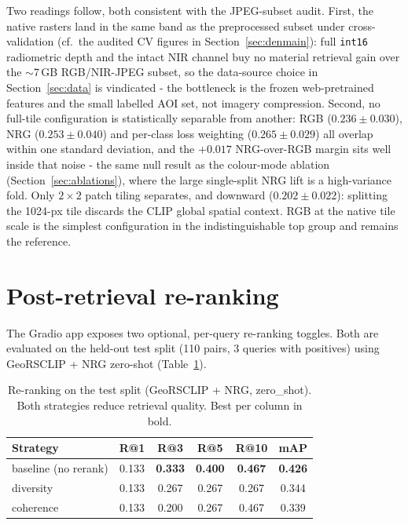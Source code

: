 \documentclass{article}
\begin{document}
Two readings follow, both consistent with the JPEG-subset audit. First, the native
rasters land in the same band as the preprocessed subset under cross-validation
(cf.\ the audited CV figures in Section~\ref{sec:denmain}): full \texttt{int16}
radiometric depth and the intact NIR channel buy no material retrieval gain over
the $\sim$7\,GB RGB/NIR-JPEG subset, so the data-source choice in
Section~\ref{sec:data} is vindicated - the bottleneck is the frozen
web-pretrained features and the small labelled AOI set, not imagery compression.
Second, no full-tile configuration is statistically separable from another: RGB
($0.236\pm0.030$), NRG ($0.253\pm0.040$) and per-class loss weighting
($0.265\pm0.029$) all overlap within one standard deviation, and the $+0.017$
NRG-over-RGB margin sits well inside that noise - the same null result as the
colour-mode ablation (Section~\ref{sec:ablations}), where the large single-split
NRG lift is a high-variance fold. Only $2\times2$ patch tiling separates, and
downward ($0.202\pm0.022$): splitting the 1024-px tile discards the CLIP global
spatial context. RGB at the native tile scale is the simplest configuration in the
indistinguishable top group and remains the reference.

\section{Post-retrieval re-ranking}
\label{sec:rerank}

The Gradio app exposes two optional, per-query re-ranking toggles. Both are
evaluated on the held-out test split (110 pairs, 3 queries with positives) using
GeoRSCLIP + NRG zero-shot (Table~\ref{tab:rerank}).

\begin{table}[H]
    \centering
    \caption{Re-ranking on the test split (GeoRSCLIP + NRG, zero\_shot). Both
    strategies reduce retrieval quality. Best per column in bold.}
    \label{tab:rerank}
    \begin{tabular}{lccccc}
        \toprule
        \textbf{Strategy} & \textbf{R@1} & \textbf{R@3} & \textbf{R@5} & \textbf{R@10} & \textbf{mAP} \\
        \midrule
        baseline (no rerank) & 0.133 & \textbf{0.333} & \textbf{0.400} & \textbf{0.467} & \textbf{0.426} \\
        diversity            & 0.133 & 0.267 & 0.267 & 0.267 & 0.344 \\
        coherence            & 0.133 & 0.200 & 0.267 & 0.467 & 0.339 \\
        \bottomrule
    \end{tabular}
\end{table}
\end{document}

